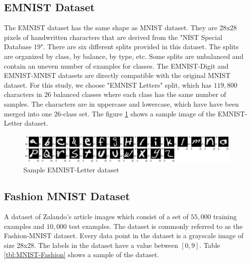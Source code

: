 \subsection{EMNIST Dataset}
The EMNIST dataset has the same shape as MNIST dataset. They are 28x28 pixels of handwritten characters that are derived from the "NIST Special Database 19". There are six different splits provided in this dataset. The splits are organized by class, by balance, by type, etc. Some splits are unbalanced and contain an uneven number of examples for classes. The EMNIST-Digit and EMNIST-MNIST datasets are directly compatible with the original MNIST dataset. For this study, we choose "EMNIST Letters" split, which has $119,800$ characters in 26 balanced classes where each class has the same number of samples. The characters are in uppercase and lowercase, which have have been merged into one 26-class set.
The figure \ref{fig:emnist-letter} shows a sample image of the EMNIST-Letter dataset.

\begin{figure}[htb!]
        \centering
    
            \centering
            \includegraphics[width=\linewidth]{images/letter.png}
            \caption{Sample EMNIST-Letter dataset}
            \label{fig:EMNIST MNIST dataset}
        \label{fig:emnist-letter}
    \end{figure}
    \FloatBarrier

    
\subsection{Fashion MNIST Dataset}
A dataset of Zalando's article images which consist of a set of $55,000$ training examples and $10,000$ test examples. The dataset is commonly referred to as the Fashion-MNIST dataset. Every data point in the dataset is a grayscale image of size 28x28. The labels in the dataset have a value between $[0, 9]$. Table \ref{tbl:MNIST-Fashion} shows a sample of the dataset.

